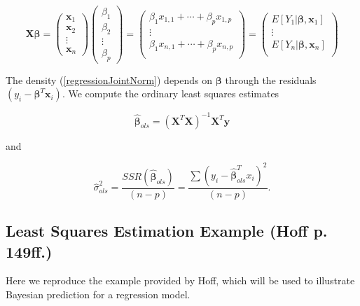 \documentclass[12pt, a4paper]{article}
\begin{document}
\begin{equation*}
    \mathbf{X}\boldsymbol\beta =
    \begin{pmatrix}
        \mathbf{x}_1 \\
        \mathbf{x}_2 \\
        \vdots  \\
        \mathbf{x}_n
    \end{pmatrix}
    \begin{pmatrix}
        \beta_1 \\
        \beta_2 \\
        \vdots \\
        \beta_p
    \end{pmatrix}
    =
    \begin{pmatrix}
        \beta_1 x_{1,1} + \cdots + \beta_p x_{1,p} \\
        \vdots \\
        \beta_1 x_{n,1} + \cdots + \beta_p x_{n,p} \\
    \end{pmatrix}
    =
    \begin{pmatrix}
        E\left[Y_1|\mathbf{\boldsymbol\beta},\mathbf{x}_1\right] \\
        \vdots \\
        E\left[Y_n|\mathbf{\boldsymbol\beta},\mathbf{x}_n\right] \\
    \end{pmatrix}
\end{equation*}

\noindent The density (\ref{regressionJointNorm}) depends on $\boldsymbol\beta$ through the residuals $\left(y_i - \boldsymbol\beta^T\mathbf{x}_i\right)$.  We compute the ordinary least squares estimates

$$\hat{\boldsymbol\beta}_{ols} = \left(\mathbf{X}^T\mathbf{X}\right)^{-1}\mathbf{X}^T\mathbf{y}$$

\noindent and

$$\hat{\sigma}^2_{ols} = \frac{SSR\left(\hat{\boldsymbol\beta}_{ols}\right)}{(n-p)} = \frac{\sum\left(y_i - \hat{\boldsymbol\beta}_{ols}^T x_i\right)^2}{(n-p)}.$$




\subsection{Least Squares Estimation Example (Hoff p. 149ff.)}

\noindent Here we reproduce the example provided by Hoff, which will be used to illustrate Bayesian prediction for a regression model.\\
\end{document}
